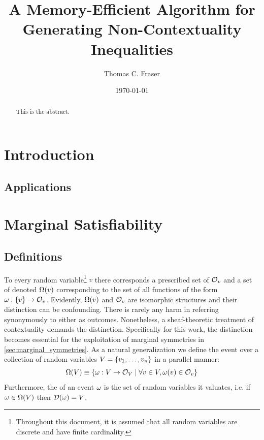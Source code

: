 \documentclass[aps, 10pt, english, twoside, twocolumn, pra, nofootinbib, tightenlines, longbibliography, superscriptaddress]{revtex4-1}
\begin{document}
    \title{
    A Memory-Efficient Algorithm for Generating Non-Contextuality Inequalities
    }
    \author{Thomas C. Fraser}
    \date{\today}
    \begin{abstract}
        This is the abstract.
    \end{abstract}
    \maketitle
    \tableofcontents

    \section{Introduction}
    \subsection{Applications}

    \section{Marginal Satisfiability}
    \subsection{Definitions}
    To every random variable\footnote{Throughout this document, it is assumed that all random variables are discrete and have finite cardinality.} $v$ there corresponds a prescribed set of  $\mathcal{O}_{v}$ and a set of  denoted $\events{v}$ corresponding to the set of all functions of the form $\w : \bc{v} \to \outcomes{v}$. Evidently, $\events{v}$ and $\mathcal{O}_{v}$ are isomorphic structures and their distinction can be confounding. There is rarely any harm in referring synonymously to either as outcomes. Nonetheless, a sheaf-theoretic treatment of contextuality \cite{Abramsky_2011} demands the distinction. Specifically for this work, the distinction becomes essential for the exploitation of marginal symmetries in \cref{sec:marginal_symmetries}. As a natural generalization we define the event over a collection of random variables $V = \bc{v_1, \ldots, v_n}$ in a parallel manner:
    \[ \events{V} \defined \bc{\w : V \to \outcomes{V} \mid \forall v \in V, \w\br{v} \in \outcomes{v}} \]
    Furthermore, the  of an event $\omega$ is the set of random variables it valuates, i.e. if $\w \in \events{V}$ then $\domain{\w} = V$.
\end{document}
